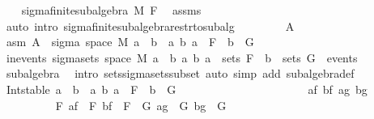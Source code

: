 \begin{isabellebody}
\ \ \isamarkupfalse%
\ sigma{\isacharunderscore}{\kern0pt}finite{\isacharunderscore}{\kern0pt}subalgebra\ M\ F\ \isamarkupfalse%
\ assms\ \isamarkupfalse%
\ {\isacharparenleft}{\kern0pt}auto\ intro{\isacharcolon}{\kern0pt}\ sigma{\isacharunderscore}{\kern0pt}finite{\isacharunderscore}{\kern0pt}subalgebra{\isacharunderscore}{\kern0pt}restr{\isacharunderscore}{\kern0pt}to{\isacharunderscore}{\kern0pt}subalg{\isacharparenright}{\kern0pt}\isanewline
\ \ \isacommand{{\isacharbraceleft}{\kern0pt}}\isamarkupfalse%
\isanewline
\ \ \ \ \isamarkupfalse%
\ A\isanewline
\ \ \ \ \isamarkupfalse%
\ asm{\isacharcolon}{\kern0pt}\ {\isachardoublequoteopen}A\ {\isasymin}\ sigma\ {\isacharparenleft}{\kern0pt}space\ M{\isacharparenright}{\kern0pt}\ {\isacharbraceleft}{\kern0pt}a\ {\isasyminter}\ b\ {\isacharbar}{\kern0pt}\ a\ b{\isachardot}{\kern0pt}\ a\ {\isasymin}\ F\ {\isasymand}\ b\ {\isasymin}\ G{\isacharbraceright}{\kern0pt}{\isachardoublequoteclose}\isanewline
\ \ \ \ \isamarkupfalse%
\ in{\isacharunderscore}{\kern0pt}events{\isacharcolon}{\kern0pt}\ {\isachardoublequoteopen}sigma{\isacharunderscore}{\kern0pt}sets\ {\isacharparenleft}{\kern0pt}space\ M{\isacharparenright}{\kern0pt}\ {\isacharbraceleft}{\kern0pt}a\ {\isasyminter}\ b\ {\isacharbar}{\kern0pt}a\ b{\isachardot}{\kern0pt}\ a\ {\isasymin}\ sets\ F\ {\isasymand}\ b\ {\isasymin}\ sets\ G{\isacharbraceright}{\kern0pt}\ {\isasymsubseteq}\ events{\isachardoublequoteclose}\ \isamarkupfalse%
\ subalgebra\ \isamarkupfalse%
\ {\isacharparenleft}{\kern0pt}intro\ sets{\isachardot}{\kern0pt}sigma{\isacharunderscore}{\kern0pt}sets{\isacharunderscore}{\kern0pt}subset{\isacharcomma}{\kern0pt}\ auto\ simp\ add{\isacharcolon}{\kern0pt}\ subalgebra{\isacharunderscore}{\kern0pt}def{\isacharparenright}{\kern0pt}\isanewline
\ \ \ \ \isamarkupfalse%
\ {\isachardoublequoteopen}Int{\isacharunderscore}{\kern0pt}stable\ {\isacharbraceleft}{\kern0pt}a\ {\isasyminter}\ b\ {\isacharbar}{\kern0pt}\ a\ b{\isachardot}{\kern0pt}\ a\ {\isasymin}\ F\ {\isasymand}\ b\ {\isasymin}\ G{\isacharbraceright}{\kern0pt}{\isachardoublequoteclose}\isanewline
\ \ \ \ \isamarkupfalse%
\ {\isacharminus}{\kern0pt}\isanewline
\ \ \ \ \ \ \isacommand{{\isacharbraceleft}{\kern0pt}}\isamarkupfalse%
\isanewline
\ \ \ \ \ \ \ \ \isamarkupfalse%
\ af\ bf\ ag\ bg\isanewline
\ \ \ \ \ \ \ \ \isamarkupfalse%
\ F{\isacharcolon}{\kern0pt}\ {\isachardoublequoteopen}af\ {\isasymin}\ F{\isachardoublequoteclose}\ {\isachardoublequoteopen}bf\ {\isasymin}\ F{\isachardoublequoteclose}\ \ G{\isacharcolon}{\kern0pt}\ {\isachardoublequoteopen}ag\ {\isasymin}\ G{\isachardoublequoteclose}\ {\isachardoublequoteopen}bg\ {\isasymin}\ G{\isachardoublequoteclose}\isanewline

\end{isabellebody}
